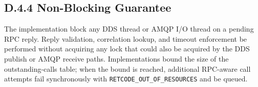 \documentclass{../styles/zerodds-vendor-spec}
\begin{document}
\subsection*{D.4.4 Non-Blocking Guarantee}

The implementation  block any DDS thread or
AMQP I/O thread on a pending RPC reply. Reply validation,
correlation lookup, and timeout enforcement
 be performed without acquiring any lock that could
also be acquired by the DDS publish or AMQP receive paths.
Implementations  bound the size of the
outstanding-calls table; when the bound is reached, additional
RPC-aware call attempts  fail synchronously with
\texttt{RETCODE\_OUT\_OF\_RESOURCES} and  be
queued.
\end{document}
